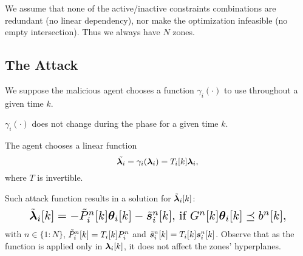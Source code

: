 \documentclass{ifacconf}  %
\begin{document}
 \begin{assumption}
   We assume that none of the active/inactive constraints combinations are redundant (no linear dependency), nor make the optimization infeasible (no empty intersection).
   Thus we always have $N$ zones.
 \end{assumption}



\subsection{The Attack}\label{ssec:attack}
We suppose the malicious agent chooses a function $\gamma_{i}(\cdot)$ to use throughout a given time $k$.
\begin{assumption}
  $\gamma_{i}(\cdot)$ does not change during the \negotiation{} phase for a given time $k$.
\end{assumption}

\begin{assumption}
  The agent chooses a linear function
  \begin{equation}
\tilde{\lambdai}=\gamma_{i}(\vec{\lambda}_{i})=\Tik\vec{\lambda}_{i},
\end{equation}
  where $T$ is invertible.
\end{assumption}

Such attack function results in a \pwa{} solution for $\tilde{\boldsymbol{\lambda}}_i[k]$:
\begin{equation}
  \resizebox{.88\columnwidth}{!}{$
    \label{eq:linear_cheating}
    \lambdaicheat[k]=
      -\tilde{P}_{i}^{n}[k]\thetaik-\tilde{\vec{s}}_{i}^{n}[k]\text{, if}\ G^{n}[k]\thetaik \preceq b^{n}[k],
    $}
\end{equation}
with $n\in\{1\mathbin{:}N\}$, $\tilde{P}_{i}^{n}[k]=\Tik P_{i}^{n}$ and $\tilde{\vec{s}}_{i}^{n}[k]=\Tik\vec{s}_{i}^{n}[k]$.
Observe that as the function is applied only in $\lambdaik$, it does not affect the zones' hyperplanes.
\end{document}
